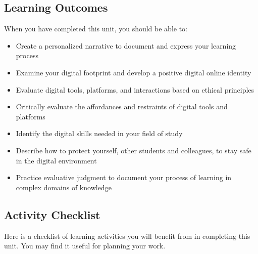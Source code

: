 \documentclass[
]{book}
\providecommand{\tightlist}{%
  \setlength{\itemsep}{0pt}\setlength{\parskip}{0pt}}
\theoremstyle{definition}
\theoremstyle{definition}
\theoremstyle{definition}
\theoremstyle{definition}
\theoremstyle{remark}
\begin{document}
\hypertarget{learning-outcomes-3}{%
\subsection*{Learning Outcomes}\label{learning-outcomes-3}}

When you have completed this unit, you should be able to:

\begin{itemize}
\tightlist
\item
  Create a personalized narrative to document and express your learning process\\
\item
  Examine your digital footprint and develop a positive digital online identity\\
\item
  Evaluate digital tools, platforms, and interactions based on ethical principles\\
\item
  Critically evaluate the affordances and restraints of digital tools and platforms\\
\item
  Identify the digital skills needed in your field of study\\
\item
  Describe how to protect yourself, other students and colleagues, to stay safe in the digital environment\\
\item
  Practice evaluative judgment to document your process of learning in complex domains of knowledge
\end{itemize}

\hypertarget{activity-checklist-3}{%
\subsection*{Activity Checklist}\label{activity-checklist-3}}

Here is a checklist of learning activities you will benefit from in completing this unit. You may find it useful for planning your work.
\end{document}
